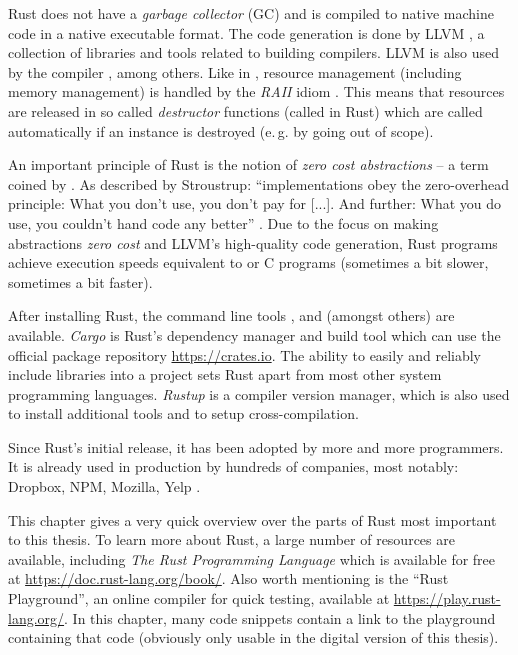 Rust does not have a \emph{garbage collector} (GC) and is compiled to native machine code in a native executable format.
The code generation is done by LLVM \cite{llvmwebsite, lattner2004llvm}, a collection of libraries and tools related to building compilers.
LLVM is also used by the \cpp compiler , among others.
Like in \cpp, resource management (including memory management) is handled by the \emph{RAII} idiom \cite{raiihackcraft, stroustrup2001exception}.
This means that resources are released in so called \emph{destructor} functions (called  in Rust) which are called automatically if an instance is destroyed (e.\,g. by going out of scope).

An important principle of Rust is the notion of \emph{zero cost abstractions} -- a term coined by \cpp.
As described by Stroustrup: \enquote{\cpp implementations obey the zero-overhead principle: What you don’t use, you don’t pay for [...]. And further: What you do use, you couldn’t hand code any better} \cite{stroustrup2012foundations}.
Due to the focus on making abstractions \emph{zero cost} and LLVM's high-quality code generation, Rust programs achieve execution speeds equivalent to \cpp or C programs (sometimes a bit slower, sometimes a bit faster).

After installing Rust, the command line tools ,  and  (amongst others) are available.
\emph{Cargo} is Rust's dependency manager and build tool which can use the official package repository \url{https://crates.io}.
The ability to easily and reliably include libraries into a project sets Rust apart from most other system programming languages.
\emph{Rustup} is a compiler version manager, which is also used to install additional tools and to setup cross-compilation.

Since Rust's initial release, it has been adopted by more and more programmers.
It is already used in production by hundreds of companies, most notably: Dropbox, NPM, Mozilla, Yelp \cite{rust-production}.

This chapter gives a very quick overview over the parts of Rust most important to this thesis.
To learn more about Rust, a large number of resources are available, including \emph{The Rust Programming Language} \cite{klabnik2018rust} which is available for free at \url{https://doc.rust-lang.org/book/}.
Also worth mentioning is the \enquote{Rust Playground}, an online compiler for quick testing, available at \url{https://play.rust-lang.org/}.
In this chapter, many code snippets contain a link to the playground containing that code (obviously only usable in the digital version of this thesis).


